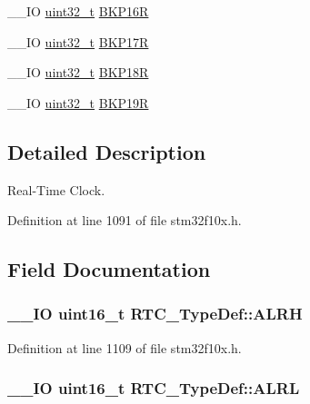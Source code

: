 \begin{DoxyCompactItemize}
\item 
\-\_\-\-\_\-\-I\-O \hyperlink{stdint_8h_a435d1572bf3f880d55459d9805097f62}{uint32\-\_\-t} \hyperlink{struct_r_t_c___type_def_a181ad73082bde7d74010aac16bd373fc}{B\-K\-P16\-R}
\item 
\-\_\-\-\_\-\-I\-O \hyperlink{stdint_8h_a435d1572bf3f880d55459d9805097f62}{uint32\-\_\-t} \hyperlink{struct_r_t_c___type_def_a90a305a8e00b357f28daef5041e5a8b1}{B\-K\-P17\-R}
\item 
\-\_\-\-\_\-\-I\-O \hyperlink{stdint_8h_a435d1572bf3f880d55459d9805097f62}{uint32\-\_\-t} \hyperlink{struct_r_t_c___type_def_a171288f82cab2623832de779fb435d74}{B\-K\-P18\-R}
\item 
\-\_\-\-\_\-\-I\-O \hyperlink{stdint_8h_a435d1572bf3f880d55459d9805097f62}{uint32\-\_\-t} \hyperlink{struct_r_t_c___type_def_a993f54e8feff9254f795dfd3e000fc55}{B\-K\-P19\-R}
\end{DoxyCompactItemize}


\subsection{Detailed Description}
Real-\/\-Time Clock. 

Definition at line 1091 of file stm32f10x.\-h.



\subsection{Field Documentation}
\hypertarget{struct_r_t_c___type_def_a873ee28923e732677a3a58971bdc9e6b}{
\subsubsection[{A\-L\-R\-H}]{\setlength{\rightskip}{0pt plus 5cm}\-\_\-\-\_\-\-I\-O {\bf uint16\-\_\-t} R\-T\-C\-\_\-\-Type\-Def\-::\-A\-L\-R\-H}}\label{struct_r_t_c___type_def_a873ee28923e732677a3a58971bdc9e6b}


Definition at line 1109 of file stm32f10x.\-h.

\hypertarget{struct_r_t_c___type_def_afea5d3abb40323a5385cf461094c06d3}{
\subsubsection[{A\-L\-R\-L}]{\setlength{\rightskip}{0pt plus 5cm}\-\_\-\-\_\-\-I\-O {\bf uint16\-\_\-t} R\-T\-C\-\_\-\-Type\-Def\-::\-A\-L\-R\-L}}\label{struct_r_t_c___type_def_afea5d3abb40323a5385cf461094c06d3}


